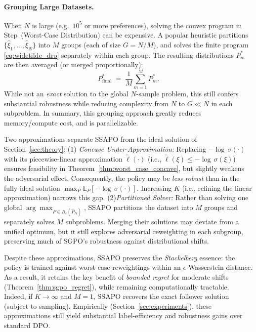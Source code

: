 \paragraph{Grouping Large Datasets.}
When $N$ is large (e.g.\ $\!10^5\!$ or more preferences), solving the convex program 
in Step~(Worst-Case Distribution) can be expensive.  A popular heuristic partitions 
$\{\hat{\xi}_1,\dots,\hat{\xi}_N\}$ into $M$ groups (each of size $G=N/M$), 
and solves the finite program \eqref{eq:widetilde_dro} separately within each group.   %
The resulting distributions $P^*_m$ are then averaged (or merged proportionally):
$$
P_{\mathrm{final}}^*
\;=\;
\frac{1}{M}
\sum_{m=1}^M
P^*_m.
$$
While not an \emph{exact} solution to the global $N$-sample problem, 
this still confers substantial robustness while reducing complexity from 
$N$ to $G \ll N$ in each subproblem. In summary, this grouping approach greatly reduces memory/compute cost, and is parallelizable.

\begin{remark}
    Two approximations separate SSAPO from the ideal solution of 
Section~\ref{sec:theory}: (1) \emph{Concave Under-Approximation:}  
 Replacing $-\!\log\,\sigma(\cdot)$ with its piecewise-linear approximation $\widetilde{\ell}(\cdot)$ (i.e., $\widetilde{\ell}(\xi)\le -\!\log\,\sigma(\xi)$) ensures feasibility in Theorem~\ref{thm:worst_case_concave}, but slightly weakens the adversarial effect. Consequently, the policy may be \emph{less robust} than in the fully ideal solution $\max_{P}\!\mathbb{E}_P[-\!\log\,\sigma(\cdot)]$. Increasing $K$ (i.e., refining the linear approximation) narrows this gap. (2)\emph{Partitioned Solver:}   Rather than solving one global $\arg\max_{P \in B_\epsilon(\hat{P}_N)}$, SSAPO partitions the dataset into $M$ groups and separately solves $M$ subproblems. Merging their solutions may deviate from a unified optimum, but it still explores adversarial reweighting in each subgroup, preserving much of SGPO’s robustness against distributional shifts.
\end{remark}

\vspace{-0.1 in}
Despite these approximations, SSAPO preserves the \emph{Stackelberg} essence: the policy is trained against worst-case reweightings within an $\epsilon$-Wasserstein distance. As a result, it retains the key benefit of \emph{bounded regret} for moderate shifts (Theorem~\ref{thm:sgpo_regret}), while remaining computationally tractable. Indeed, if $K \!\to\! \infty$ and $M\!=\!1$, SSAPO recovers the exact follower solution (subject to sampling). Empirically (Section~\ref{sec:experiments}), these approximations still yield substantial label-efficiency and robustness gains over standard DPO.

